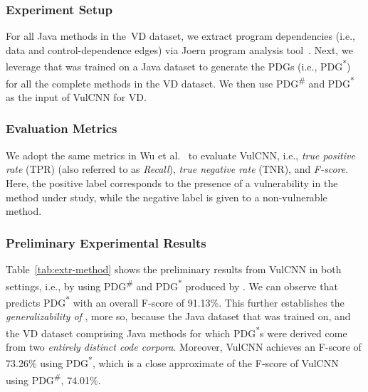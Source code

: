 \subsubsection*{\bf Experiment Setup}
For all Java methods in the~VD dataset, we extract program
dependencies (i.e., data and control-dependence edges) via Joern
program analysis tool~\cite{joern-2014}. Next, we leverage \tool that
was trained on a Java dataset
to generate the PDGs (i.e., PDG\textsuperscript{*}) for all the
complete methods in the VD dataset. We then use
PDG\textsuperscript{\#} and PDG\textsuperscript{*} as the input of
VulCNN for VD.

\subsubsection*{\bf Evaluation Metrics}
We adopt the same metrics in Wu et al.~\cite{wu2022vulcnn} to
evaluate VulCNN, i.e., \textit{true positive rate} (TPR) (also
referred to as \textit{Recall}), \textit{true negative rate} (TNR),
and \textit{F-score}. Here, the positive label corresponds to the
presence of a vulnerability in the method under study, while the
negative label is given to a non-vulnerable method.


\subsubsection*{\bf Preliminary Experimental Results}
Table~\ref{tab:extr-method} shows the preliminary results from VulCNN
in both settings, i.e., by using PDG\textsuperscript{\#} and
PDG\textsuperscript{*} produced by {\tool}. We can observe that \tool predicts
PDG\textsuperscript{*} with an overall F-score of 91.13\%. This
further establishes the {\em generalizability of \tool}, more so,
because the Java dataset that \tool was trained on, and the VD dataset
comprising Java methods for which PDG\textsuperscript{*}s were derived
come from two {\em entirely distinct code corpora}. Moreover, VulCNN
achieves an F-score of 73.26\% using PDG\textsuperscript{*}, which is
a close approximate of the F-score of VulCNN using
PDG\textsuperscript{\#}, 74.01\%.

